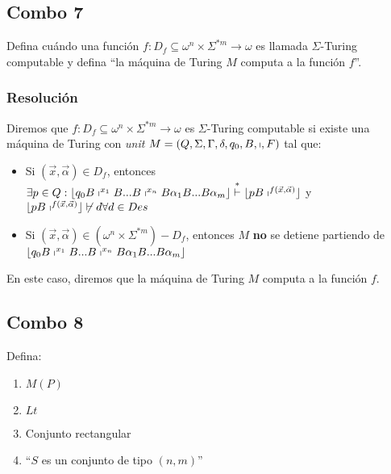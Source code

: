 \documentclass[
]{article}
\providecommand{\tightlist}{%
  \setlength{\itemsep}{0pt}\setlength{\parskip}{0pt}}
\begin{document}
\subsection{Combo 7}\label{combo-7}

Defina cuándo una función
\(f:D_f\subseteq\omega^n\times\Sigma^{*m}\to\omega\) es llamada
\(\Sigma\)-Turing computable y defina ``la máquina de Turing \(M\)
computa a la función \(f\)''.

\subsubsection{Resolución}\label{resoluciuxf3n-6}

Diremos que \(f:D_f\subseteq\omega^n\times\Sigma^{*m}\to\omega\) es
\(\Sigma\)-Turing computable si existe una máquina de Turing con
\emph{unit} \(M=(Q,\Sigma,\Gamma,\delta,q_0,B,\shortmid,F)\) tal que:

\begin{itemize}
\tightlist
\item
  Si \((\vec{x},\vec{\alpha})\in D_f\), entonces
  \(\exists p\in Q:\lfloor q_0B\shortmid^{x_1}B...B\shortmid^{x_n}B\alpha_1B...B\alpha_m\rfloor\overset{*}{\vdash}\lfloor pB\shortmid^{f(\vec{x},\vec{\alpha})}\rfloor\)
  y
  \(\lfloor pB\shortmid^{f(\vec{x},\vec{\alpha})}\rfloor\not\vdash d\forall d\in Des\)
\item
  Si \((\vec{x},\vec{\alpha})\in (\omega^n\times\Sigma^{*m})-D_f\),
  entonces \(M\) \textbf{no} se detiene partiendo de
  \(\lfloor q_0B\shortmid^{x_1}B...B\shortmid^{x_n}B\alpha_1B...B\alpha_m\rfloor\)
\end{itemize}

En este caso, diremos que la máquina de Turing \(M\) computa a la
función \(f\).

\subsection{Combo 8}\label{combo-8}

Defina:

\begin{enumerate}
\def\labelenumi{\arabic{enumi}.}
\tightlist
\item
  \(M(P)\)
\item
  \(Lt\)
\item
  Conjunto rectangular
\item
  ``\(S\) es un conjunto de tipo \((n,m)\)''
\end{enumerate}
\end{document}
